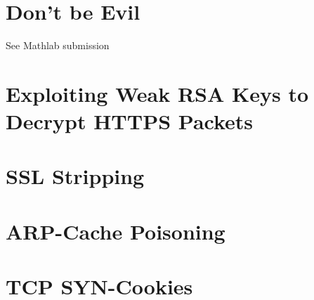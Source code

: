 \documentclass{article}
\begin{document}
\section{Don't be Evil}
See Mathlab submission
\section{Exploiting Weak RSA Keys to Decrypt HTTPS Packets}
\section{SSL Stripping}
\section{ARP-Cache Poisoning}
\section{TCP SYN-Cookies }
\end{document}
